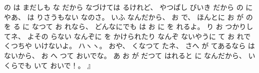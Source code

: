 %
の
は
まだしも
な
だから
なづけては
るけれど、
%
やつぱし
びいき
だから
の
にやあ、
%
は
りさうもない
なのさ。
%
いふ
なんだから、
%
お
で、
%
ほんとに
お
が
の
を
る
に
なつて
お
れなら、
%
どんなにでも
は
お
に
を
れるよ。
%
%
り
お
つかりしてネ、
%
よその
らない
なんぞに
を
かけられたり
なんぞ
ないやうに
て
お
れで
くつちや
いけないよ。
%
ハヽヽ。
%
おや、
%
くなつて
たネ、
%
さへ
が
てあるなら
はないから、
%
お
へ
つて
おいでな。
%
あ
お
が
だつて
はれると
に
なんだから、
%
いくらでも
いて
おいで！。
』

